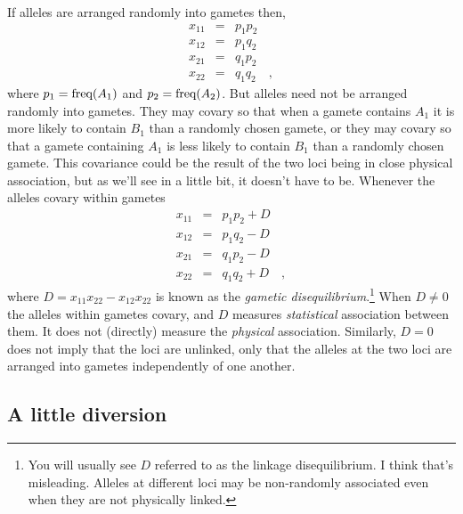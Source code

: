 If alleles are arranged randomly into gametes then,
\begin{eqnarray*}
x_{11} &=& p_1p_2 \\
x_{12} &=& p_1q_2 \\
x_{21} &=& q_1p_2 \\
x_{22} &=& q_1q_2 \quad ,
\end{eqnarray*}
where $p_1 = \hbox{freq}(A_1)$ and $p_2 = \hbox{freq}(A_2)$. But
alleles need not be arranged randomly into gametes. They may covary so
that when a gamete contains $A_1$ it is more likely to contain $B_1$
than a randomly chosen gamete, or they may covary so that a gamete
containing $A_1$ is less likely to contain $B_1$ than a randomly
chosen gamete. This covariance could be the result of the two loci
being in close physical association, but as we'll see in a little bit,
it doesn't have to be. Whenever the alleles covary within gametes
\begin{eqnarray*}
x_{11} &=& p_1p_2 + D \\
x_{12} &=& p_1q_2 - D \\
x_{21} &=& q_1p_2 - D \\
x_{22} &=& q_1q_2 + D \quad ,
\end{eqnarray*}
where $D = x_{11}x_{22} - x_{12}x_{22}$ is known as the {\it gametic
  disequilibrium}.\footnote{You will usually see $D$ referred to as
  the linkage disequilibrium. I think that's misleading. Alleles at
  different loci may be non-randomly associated even when they are not
  physically linked.} When $D \ne 0$ the alleles within gametes
covary, and $D$ measures {\it statistical\/} association between
them. It does not (directly) measure the {\it physical\/}
association. Similarly, $D = 0$ does not imply that the loci are
unlinked, only that the alleles at the two loci are arranged into
gametes independently of one another.

\subsection*{A little diversion}

